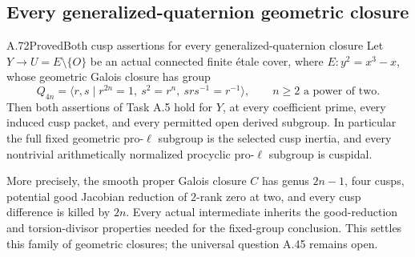 \subsection{Every generalized-quaternion geometric closure}

\begin{statement}{A.72}{Proved}{Both cusp assertions for every generalized-quaternion closure}
Let \(Y\to U=E\setminus\{O\}\) be an actual connected finite
\'{e}tale cover, where \(E:y^2=x^3-x\), whose geometric Galois
closure has group
\[
 Q_{4n}=\langle r,s\mid r^{2n}=1,\ s^2=r^n,
                         \ srs^{-1}=r^{-1}\rangle,
 \qquad n\ge2\text{ a power of two}.                  \tag{A.72.1}
\]
Then both assertions of Task A.5 hold for \(Y\), at every
coefficient prime, every induced cusp packet, and every permitted
open derived subgroup. In particular the full fixed geometric
pro-\(\ell\) subgroup is the selected cusp inertia, and every
nontrivial arithmetically normalized procyclic pro-\(\ell\)
subgroup is cuspidal.

More precisely, the smooth proper Galois closure \(C\) has genus
\(2n-1\), four cusps, potential good Jacobian reduction of
\(2\)-rank zero at two, and every cusp difference is killed by
\(2n\). Every actual intermediate inherits the good-reduction
and torsion-divisor properties needed for the fixed-group
conclusion. This settles this family of geometric closures;
the universal question A.45 remains open.
\end{statement}

